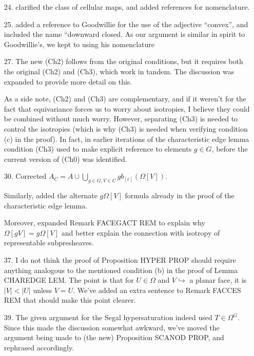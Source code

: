 \documentclass{article}
\begin{document}
\begin{itemize}
\item[24.] clarified the class of cellular maps, and added references for nomenclature.
\item[25.] added a reference to Goodwillie for the use of the adjective ``convex'', and included the name ``downward closed. As our argument is similar in spirit to Goodwillie's, we kept to using his nomenclature

\item[27.] The new (Ch2) follows from the original conditions, but it requires both the original (Ch2) and (Ch3), which work in tandem. The discussion was expanded to provide more detail on this. 

As a side note, (Ch2) and (Ch3) are complementary, and if it weren't for the fact that equivariance forces us to worry about isotropies, I believe they could be combined without much worry.
However, separating (Ch3) is needed to control the isotropies (which is why (Ch3) is needed when verifying condition (c) in the proof). In fact, in earlier iterations of the characteristic edge lemma condition (Ch3) used to make explicit reference to elements $g \in G$, before the current version of (Ch0) was identified.

\item[30.] Corrected $A_C = 
A \cup \bigcup_{g\in G,V \in C} g b_{[e]}(\Omega[V])$.

Similarly, added the alternate $g \Omega[V]$ formula already in the proof of the characteristic edge lemma.

Moreover, expanded Remark FACEGACT REM to explain why $\Omega[gV] = g\Omega[V]$ and better explain the connection with isotropy of representable subpresheaves.



\item[37.] I do not think the proof of Proposition HYPER PROP should require anything analogous to the mentioned condition (b) in the proof of Lemma CHAREDGE LEM. The point is that for $U \in \Omega$ and $V \hookrightarrow$ a planar face, it is $|V|<|U|$ unless $V=U$. We've added an extra sentence to Remark FACCES REM that should make this point clearer.

\item[39.] The given argument for the Segal hypersaturation indeed used $T \in \Omega^G$. Since this made the discussion somewhat awkward, we've moved the argument being made to (the  new) Proposition SCANOD PROP, and rephrased accordingly.




\end{itemize}
\end{document}
